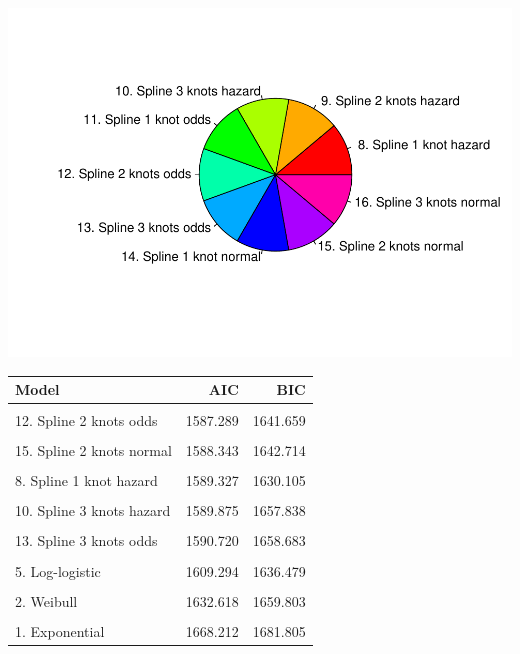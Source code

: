 \documentclass[
]{article}
\begin{document}
\begin{flushleft}\includegraphics{Images/spline-1} \end{flushleft}

\begin{table}[H]
\centering
\begin{tabular}{lrr}
\toprule
Model & AIC & BIC\\
\midrule
\cellcolor{gray!6}{9. Spline 2 knots hazard} & \cellcolor{gray!6}{1585.894} & \cellcolor{gray!6}{1640.264}\\
12. Spline 2 knots odds & 1587.289 & 1641.659\\
\cellcolor{gray!6}{14. Spline 1 knot normal} & \cellcolor{gray!6}{1587.682} & \cellcolor{gray!6}{1628.460}\\
15. Spline 2 knots normal & 1588.343 & 1642.714\\
\cellcolor{gray!6}{7. Generalised Gamma} & \cellcolor{gray!6}{1589.049} & \cellcolor{gray!6}{1629.826}\\
8. Spline 1 knot hazard & 1589.327 & 1630.105\\
\cellcolor{gray!6}{16. Spline 3 knots normal} & \cellcolor{gray!6}{1589.832} & \cellcolor{gray!6}{1657.795}\\
10. Spline 3 knots hazard & 1589.875 & 1657.838\\
\cellcolor{gray!6}{11. Spline 1 knot odds} & \cellcolor{gray!6}{1590.221} & \cellcolor{gray!6}{1630.999}\\
13. Spline 3 knots odds & 1590.720 & 1658.683\\
\cellcolor{gray!6}{4. Log-normal} & \cellcolor{gray!6}{1592.880} & \cellcolor{gray!6}{1620.066}\\
5. Log-logistic & 1609.294 & 1636.479\\
\cellcolor{gray!6}{6. Gamma} & \cellcolor{gray!6}{1621.982} & \cellcolor{gray!6}{1649.167}\\
2. Weibull & 1632.618 & 1659.803\\
\cellcolor{gray!6}{3. Gompertz} & \cellcolor{gray!6}{1660.954} & \cellcolor{gray!6}{1688.140}\\
1. Exponential & 1668.212 & 1681.805\\
\bottomrule
\end{tabular}
\end{table}
\end{document}
